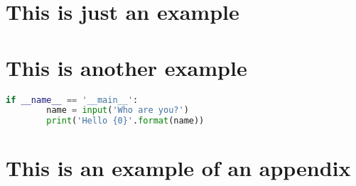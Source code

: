 \documentclass[12pt, lof, lot, lol]{ulinternshipreport}
\begin{document}
\chapter{This is just an example}
\lipsum

\chapter{This is another example}
\lipsum

\begin{lstlisting}[language=Python,%
                   label={code:dummy_example},%
                   caption={A dummy example}]
    if __name__ == '__main__':
        name = input('Who are you?')
        print('Hello {0}'.format(name))
\end{lstlisting}

\appendix

\chapter{This is an example of an appendix}
\lipsum
\end{document}
